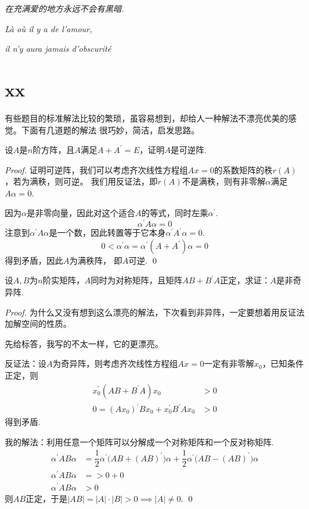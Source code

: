 \begin{introduction}
	\item \emph{在充满爱的地方永远不会有黑暗.}
	\item \emph{Là où il y a de l'amour,}
	\item \emph{il n'y aura jamais d'obscurité}
\end{introduction}

\section{xx}

有些题目的标准解法比较的繁琐，虽容易想到，却给人一种解法不漂亮优美的感觉。下面有几道题的解法
很巧妙，简洁，启发思路。

\begin{proposition}
	设$A$是$n$阶方阵，且$A$满足$A+A^\prime = E$，证明$A$是可逆阵.
\end{proposition}

\begin{proof}
	证明可逆阵，我们可以考虑齐次线性方程组$Ax=0$的系数矩阵的秩$r(A)$，若为满秩，则可逆。
	我们用反证法，即$r(A)$不是满秩，则有非零解$\alpha$满足$A\alpha = 0$.
	
	因为$\alpha$是非零向量，因此对这个适合$A$的等式，同时左乘$\alpha^\prime$.
	$$
		\alpha^\prime A \alpha = 0
	$$
	注意到$\alpha^\prime A \alpha$是一个数，因此转置等于它本身$\alpha^\prime A^\prime \alpha=0$.
	$$
		0 < \alpha^\prime \alpha = \alpha^\prime (A + A^\prime) \alpha = 0
	$$
	得到矛盾，因此$A$为满秩阵， 即$A$可逆.
	\qed
\end{proof}

\begin{ex}[北师大 2017]
	设$A,B$为$n$阶实矩阵，$A$同时为对称矩阵，且矩阵$AB+B^\prime A$正定，求证：$A$是非奇异阵.
\end{ex}

\begin{proof}
	为什么又没有想到这么漂亮的解法，下次看到非异阵，一定要想着用反证法加解空间的性质。

	先给标答，我写的不太一样，它的更漂亮。

	反证法：设$A$为奇异阵，则考虑齐次线性方程组$Ax=0$一定有非零解$x_0$，已知条件正定，则
	\begin{align*}
		x_0^\prime (AB+B^\prime A)x_0 &> 0 \\ 
		0=(A x_0)^\prime B x_0  + x_0 ^\prime B^\prime A x_0 &> 0
	\end{align*}
	得到矛盾.

	我的解法：利用任意一个矩阵可以分解成一个对称矩阵和一个反对称矩阵.
	\begin{align*}
		\alpha^\prime AB \alpha &= \dfrac{1}{2}\alpha^\prime \bigl(AB + (AB)^\prime\bigr) \alpha +  \dfrac{1}{2}\alpha^\prime \bigl( AB - (AB)^\prime\bigr) \alpha \\
		\alpha^\prime AB \alpha &= >0 + 0 \\
		\alpha^\prime AB \alpha &> 0  
	\end{align*}
	则$AB$正定，于是$|AB|=|A|\cdot |B| > 0 \implies |A| \neq 0$.
	\qed{}
\end{proof}

